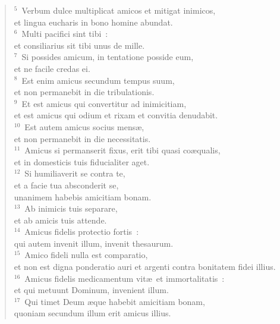 \begin{flushleft}\begin{verse}${}^{5}$~Verbum dulce multiplicat amicos et mitigat inimicos,\\ et lingua eucharis in bono homine abundat.\\
${}^{6}$~Multi pacifici sint tibi~:\\ et consiliarius sit tibi unus de mille.\\
${}^{7}$~Si possides amicum, in tentatione posside eum,\\ et ne facile credas ei.\\
${}^{8}$~Est enim amicus secundum tempus suum,\\ et non permanebit in die tribulationis.\\
${}^{9}$~Et est amicus qui convertitur ad inimicitiam,\\ et est amicus qui odium et rixam et convitia denudabit.\\
${}^{10}$~Est autem amicus socius mens\ae ,\\ et non permanebit in die necessitatis.\\
${}^{11}$~Amicus si permanserit fixus, erit tibi quasi co\ae qualis,\\ et in domesticis tuis fiducialiter aget.\\
${}^{12}$~Si humiliaverit se contra te,\\ et a facie tua absconderit se,\\ unanimem habebis amicitiam bonam.\\
${}^{13}$~Ab inimicis tuis separare,\\ et ab amicis tuis attende.\\
${}^{14}$~Amicus fidelis protectio fortis~:\\ qui autem invenit illum, invenit thesaurum.\\
${}^{15}$~Amico fideli nulla est comparatio,\\ et non est digna ponderatio auri et argenti contra bonitatem fidei illius.\\
${}^{16}$~Amicus fidelis medicamentum vit\ae\ et immortalitatis~:\\ et qui metuunt Dominum, invenient illum.\\
${}^{17}$~Qui timet Deum \ae que habebit amicitiam bonam,\\ quoniam secundum illum erit amicus illius.\end{verse}\end{flushleft}


